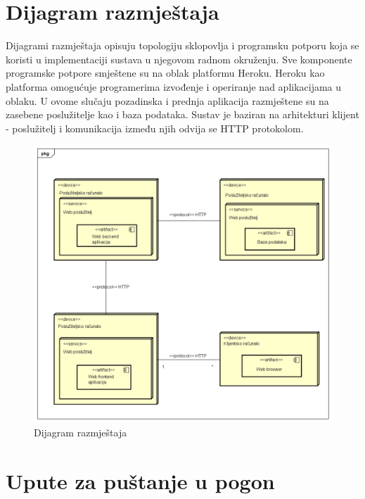			\eject 
		
		
		\section{Dijagram razmještaja}
			 
			 Dijagrami razmještaja opisuju topologiju sklopovlja i programsku potporu koja se koristi u implementaciji sustava u njegovom radnom okruženju. Sve komponente programske potpore smještene su na oblak platformu Heroku. Heroku kao platforma omogućuje programerima izvođenje i operiranje nad aplikacijama u oblaku. U ovome slučaju pozadinska i prednja aplikacija razmještene su na zasebene poslužitelje kao i baza podataka. Sustav je baziran na arhitekturi klijent - poslužitelj i komunikacija između njih odvija se HTTP protokolom. 
			 
			 	\begin{figure}[H]
			 	\begin{center}
			 		\includegraphics[width=15cm]{slike/deploy_fin.PNG}
			 	\end{center}
			 	\caption{Dijagram razmještaja}
			 	\label{fig:deploy_pic}
			 \end{figure}
			
			\eject 
		
		\section{Upute za puštanje u pogon}
			
